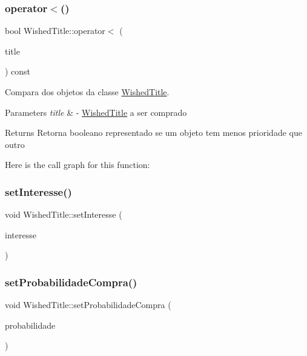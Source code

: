 \subsubsection{\texorpdfstring{operator$<$()}{operator<()}}
{\footnotesize\ttfamily bool Wished\+Title\+::operator$<$ (\begin{DoxyParamCaption}\item[{const \mbox{\hyperlink{class_wished_title}{Wished\+Title}} \&}]{title }\end{DoxyParamCaption}) const}



Compara dos objetos da classe \mbox{\hyperlink{class_wished_title}{Wished\+Title}}. 


\begin{DoxyParams}{Parameters}
{\em title} & -\/ \mbox{\hyperlink{class_wished_title}{Wished\+Title}} a ser comprado \\
\hline
\end{DoxyParams}
\begin{DoxyReturn}{Returns}
Retorna booleano representado se um objeto tem menos prioridade que outro 
\end{DoxyReturn}
Here is the call graph for this function\+:
\mbox{\label{class_wished_title_ae81814e2837a03f1bcbc1064da0e652e}} 
\subsubsection{\texorpdfstring{set\+Interesse()}{setInteresse()}}
{\footnotesize\ttfamily void Wished\+Title\+::set\+Interesse (\begin{DoxyParamCaption}\item[{int}]{interesse }\end{DoxyParamCaption})\hspace{0.3cm}{\ttfamily [inline]}}

\mbox{\label{class_wished_title_aacaf6dfce83390dcc78f0ecd679e1de1}} 
\subsubsection{\texorpdfstring{set\+Probabilidade\+Compra()}{setProbabilidadeCompra()}}
{\footnotesize\ttfamily void Wished\+Title\+::set\+Probabilidade\+Compra (\begin{DoxyParamCaption}\item[{float}]{probabilidade }\end{DoxyParamCaption})}



